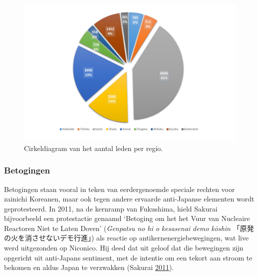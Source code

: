 \documentclass[10.5pt,dutch,]{article}
\begin{document}
\begin{figure}[!htb]
  \centering
    \includegraphics[width=.8\textwidth]{images/Zaitokukai_members.pdf}
    \caption{Cirkeldiagram van het aantal leden per regio.}
\end{figure}

\subsubsection{Betogingen}\label{betogingen}

Betogingen staan vooral in teken van eerdergenoemde speciale rechten
voor zainichi Koreanen, maar ook tegen andere ervaarde anti-Japanse
elementen wordt geprotesteerd. In 2011, na de kernramp van Fukushima,
hield Sakurai bijvoorbeeld een protestactie genaamd `Betoging om het het
Vuur van Nucleaire Reactoren Niet te Laten Doven' (\emph{Genpatsu no hi
o kesasenai demo kōshin} 「原発の火を消させないデモ行進」) als reactie
op antikernenergiebewegingen, wat live werd uitgezonden op Niconico. Hij
deed dat uit geloof dat die bewegingen zijn opgericht uit anti-Japans
sentiment, met de intentie om een tekort aan stroom te bekomen en aldus
Japan te verzwakken (Sakurai
\protect\hyperlink{ref-sakuraiux5fnihonux5f2011}{2011}).
\end{document}
